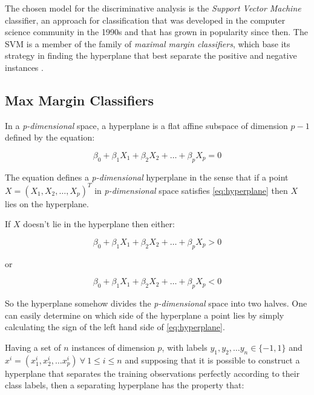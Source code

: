 The chosen model for the discriminative analysis is the \textit{Support Vector Machine} classifier,
an approach for classification that was developed in the computer science community in the 1990s
and that has grown in popularity since then. The SVM is a member of the family of
\textit{maximal margin classifiers}, which base its strategy in finding the hyperplane that
best separate the positive and negative instances \cite{svm_jwht}.

\subsection{Max Margin Classifiers}

In a \textit{p-dimensional} space, a hyperplane is a flat affine subspace of
dimension $p-1$ defined by the equation:

\begin{equation}
  \label{eq:hyperplane}
  \beta_{0} + \beta_{1}X_{1} + \beta_{2}X_{2} + \dotsc + \beta_{p}X_{p} = 0
\end{equation}

The equation defines a \textit{p-dimensional} hyperplane in the sense that if a point
$X=(X_{1}, X_{2}, \dotsc, X_{p})^{T}$ in \textit{p-dimensional} space
satisfies \ref{eq:hyperplane} then $X$ lies on the hyperplane.

If $X$ doesn't lie in the hyperplane then either:

\begin{equation}
  \beta_{0} + \beta_{1}X_{1} + \beta_{2}X_{2} + \dotsc + \beta_{p}X_{p} > 0
\end{equation}

\begin{center}or\end{center}

\begin{equation}
  \beta_{0} + \beta_{1}X_{1} + \beta_{2}X_{2} + \dotsc + \beta_{p}X_{p} < 0
\end{equation}

So the hyperplane somehow divides the \textit{p-dimensional} space into two halves. One can
easily determine on which side of the hyperplane a point lies by simply calculating the sign
of the left hand side of \ref{eq:hyperplane}.

Having a set of $n$ instances of dimension $p$, with labels
$y_{1}, y_{2}, \dotsc y_{n} \in \{-1,1\}$ and $x^{i} = (x^{i}_{1}, x^{i}_{2}, \dotsc x^{i}_{p}) \ \forall \ 1 \leq i \leq {n}$ and supposing that it is possible to construct a hyperplane that
separates the training observations perfectly according to their class labels, then a
separating hyperplane has the property that:


